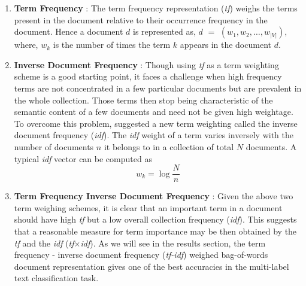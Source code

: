 \begin{enumerate}
\item{\textbf{Term Frequency} : }The term frequency representation (\emph{tf}) weighs the terms present in the document relative to their occurrence frequency in the document. Hence a document $d$ is represented as, $d$ $=$ $(w_{1}, w_{2}, \ldots, w_{|V|})$, where, $w_{k}$ is the number of times the term $k$ appears in the document $d$. 
\item{\textbf{Inverse Document Frequency} : }Though using \emph{tf} as a term weighting scheme is a good starting point, it faces a challenge when high frequency terms are not concentrated in a few particular documents but are prevalent in the whole collection. Those terms then stop being characteristic of the semantic content of a few documents and need not be given high weightage. To overcome this problem, \cite{salton1988term} suggested a new term weighting called the inverse document frequency (\emph{idf}). The \emph{idf} weight of a term varies inversely with the number of documents $n$ it belongs to in a collection of total $N$ documents. A typical \emph{idf} vector can be computed as 
\begin{equation}
w_{k} = \log \frac{N}{n}
\end{equation}
\item{\textbf{Term Frequency Inverse Document Frequency} : }Given the above two term weighing schemes, it is clear that an important term in a document should have high \emph{tf} but a low overall collection frequency (\emph{idf}). This suggests that a reasonable measure for term importance may be then obtained by the \emph{tf} and the \emph{idf} (\emph{tf}$\times$\emph{idf}). As we will see in the results section, the term frequency - inverse document frequency (\emph{tf-idf}) weighed bag-of-words document representation gives one of the best accuracies in the multi-label text classification task.
\end{enumerate}

